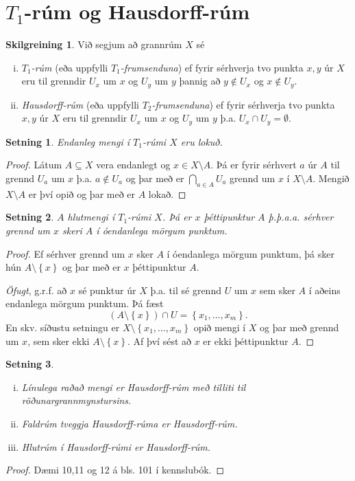\documentclass[a4paper,icelandic]{book}
\theoremstyle{definition}
\newtheorem{skilgr}{Skilgreining}[section]
\theoremstyle{plain}
\newtheorem{setn}{Setning}[section]
\theoremstyle{remark}
\begin{document}
\section{$T_1$-rúm og Hausdorff-rúm}
\begin{skilgr}
  Við segjum að grannrúm $X$ sé
  \begin{enumerate}[(i)]
  \item \emph{$T_1$-rúm} (eða uppfylli
    \emph{$T_1$-frumsenduna}) ef fyrir sérhverja tvo punkta $x,y$ úr
    $X$ eru til grenndir $U_x$ um $x$ og $U_y$ um $y$ þannig að
    $y\notin U_x$ og $x\notin U_y$.
  \item \emph{Hausdorff-rúm} (eða uppfylli
    \emph{$T_2$-frumsenduna}) ef fyrir sérhverja tvo punkta $x,y$ úr
    $X$ eru til grenndir $U_x$ um $x$ og $U_y$ um $y$ þ.a. $U_x\cap
    U_y = \emptyset$.
  \end{enumerate}
\end{skilgr}
\begin{setn}
  Endanleg mengi í $T_1$-rúmi $X$ eru lokuð.
\end{setn}
\begin{proof}
  Látum $A\subseteq X$ vera endanlegt og $x\in X\setminus A$. Þá er fyrir
  sérhvert $a$ úr $A$ til grennd $U_a$ um $x$ þ.a. $a\notin U_a$ og þar með er
  $\bigcap_{a\in A}U_a$ grennd um $x$ í $X\setminus A$. Mengið $X\setminus A$ er
  því opið og þar með er $A$ lokað.
\end{proof}
\begin{setn}
  $A$ hlutmengi í $T_1$-rúmi $X$. Þá er $x$ þéttipunktur $A$ \emph{þ.þ.a.a.}
  sérhver grennd um $x$ skeri $A$ í óendanlega mörgum punktum.
\end{setn}
\begin{proof}
  Ef sérhver grennd um $x$ sker $A$ í óendanlega mörgum punktum, þá sker hún
  $A\setminus\left\{ x \right\}$ og þar með er $x$ þéttipunktur $A$.

  \emph{Öfugt}, g.r.f. að $x$ sé punktur úr $X$ þ.a. til sé grennd $U$ um $x$
  sem sker $A$ í aðeins endanlega mörgum punktum. Þá fæst
  \[
  (A\setminus \left\{ x \right\})\cap U = \left\{ x_1,\dots,x_m \right\}.
  \]
  En skv. síðustu setningu er $X\setminus\left\{ x_1,\dots,x_m \right\}$ opið
  mengi í $X$ og þar með grennd um $x$, sem sker ekki $A\setminus\left\{ x
  \right\}$. Af því sést að $x$ er ekki þéttipunktur $A$.
\end{proof}
\begin{setn}
  \begin{enumerate}[(i)]
    \item Línulega raðað mengi er Hausdorff-rúm með tilliti til
      röðunargrannmynstursins.
    \item Faldrúm tveggja Hausdorff-rúma er Hausdorff-rúm. 
    \item Hlutrúm í Hausdorff-rúmi er Hausdorff-rúm. 
  \end{enumerate}
\end{setn}
\begin{proof}
  Dæmi 10,11 og 12 á bls. 101 í kennslubók.
\end{proof}
\end{document}
